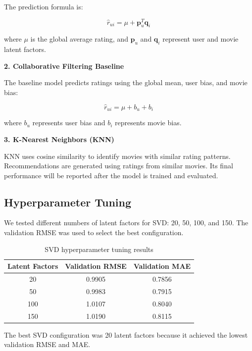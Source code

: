 \documentclass[11pt,a4paper]{article}
\begin{document}
The prediction formula is:

\begin{equation}
\hat{r}_{ui} = \mu + \mathbf{p}_u^T \mathbf{q}_i
\end{equation}

where $\mu$ is the global average rating, and
$\mathbf{p}_u$ and $\mathbf{q}_i$ represent user and movie
latent factors.

\textbf{2. Collaborative Filtering Baseline}

The baseline model predicts ratings using the global mean,
user bias, and movie bias:

\begin{equation}
\hat{r}_{ui} = \mu + b_u + b_i
\end{equation}

where $b_u$ represents user bias and $b_i$ represents movie bias.

\textbf{3. K-Nearest Neighbors (KNN)}

KNN uses cosine similarity to identify movies with similar
rating patterns. Recommendations are generated using ratings
from similar movies. Its final performance will be reported
after the model is trained and evaluated.

\subsection{Hyperparameter Tuning}

We tested different numbers of latent factors for SVD:
20, 50, 100, and 150. The validation RMSE was used to select
the best configuration.

\begin{table}[H]
\centering
\begin{tabular}{ccc}
\toprule
\textbf{Latent Factors} & \textbf{Validation RMSE} &
\textbf{Validation MAE} \\
\midrule
20  & 0.9905 & 0.7856 \\
50  & 0.9983 & 0.7915 \\
100 & 1.0107 & 0.8040 \\
150 & 1.0190 & 0.8115 \\
\bottomrule
\end{tabular}
\caption{SVD hyperparameter tuning results}
\label{tab:svd_tuning}
\end{table}

The best SVD configuration was 20 latent factors because it
achieved the lowest validation RMSE and MAE.
\end{document}
